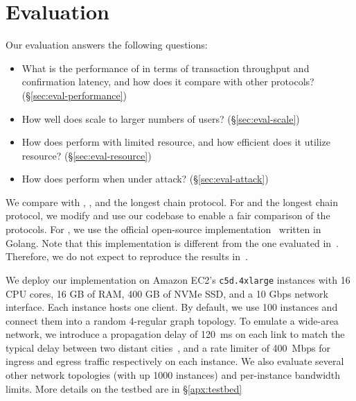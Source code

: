 \chapter{Evaluation}
\label{sec:eval}

Our evaluation answers the following questions:

\begin{itemize}
    \item What is the performance of \prism in terms of transaction throughput and confirmation latency, and how does it compare with other protocols? (\S\ref{sec:eval-performance})
    \item How well does \prism scale to larger numbers of users? (\S\ref{sec:eval-scale})
    \item How does \prism perform with limited resource, and how efficient does it utilize resource? (\S\ref{sec:eval-resource})
    \item How does \prism perform when under attack? (\S\ref{sec:eval-attack})
\end{itemize}


 We compare \prism with \algorand, \bng, and the longest chain protocol. For \bng and the longest chain protocol, we modify and use our \prism codebase to enable a fair comparison of the protocols. For \algorand, we use the official open-source implementation~\cite{algorandcode} written in Golang. Note that this implementation is different from the one evaluated in~\cite{algorand}. Therefore, we do not expect to reproduce the results in~\cite{algorand}.

         We deploy our \prism implementation on Amazon EC2's \texttt{c5d.4xlarge} instances with 16 CPU cores, 16 GB of RAM, 400 GB of NVMe SSD, and a 10 Gbps network interface. Each instance hosts one \prism client. By default, we use 100 instances and connect them into a random 4-regular graph topology. To emulate a wide-area network, we introduce a propagation delay of 120~ms on each link to match the typical delay between two distant cities~\cite{pingmeasurement}, and a rate limiter of 400~Mbps for ingress and egress traffic respectively on each instance. We also evaluate several other network topologies (with up 1000 instances) and per-instance bandwidth limits. More details on the testbed are in \S\ref{apx:testbed}

